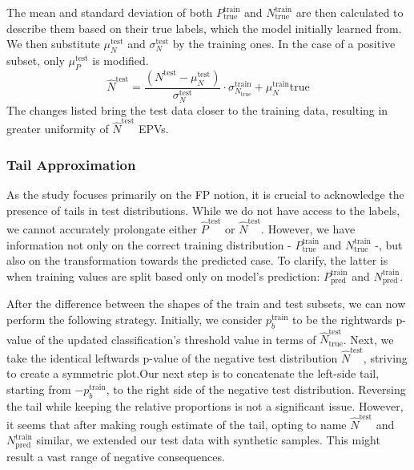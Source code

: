 \documentclass{article}
\begin{document}
The mean and standard deviation of both $P^{\text{train}}_{\text{true}}$ and $N^{\text{train}}_{\text{true}}$ are then calculated to describe them based on their true labels, which the model initially learned from. We then substitute $\mu^{\text{test}}_N$ and $\sigma^{\text{test}}_N$ by the training ones. In the case of a positive subset, only $\mu^{\text{test}}_P$ is modified.
    \begin{equation}
            \hat{N}^{\text{test}} = \frac{(N^{\text{test}} - \mu^{\text{test}}_N)}{\sigma^{\text{test}}_N} \cdot \sigma^{\text{train}}_{N_{\text{true}}} + \mu^{\text{train}}_N{\text{true}}
    \end{equation}
The changes listed bring the test data closer to the training data, resulting in greater uniformity  of $\hat{N}^{\text{test}}$ EPVs.



\subsubsection{Tail Approximation}

As the study focuses primarily on the FP notion, it is crucial to acknowledge the presence of tails in test distributions. While we do not have access to the labels, we cannot accurately prolongate either $\hat{P}^{\text{test}}$ or $ \hat{N}^{\text{test}}$. However, we have information not only on the correct training distribution - $P^{\text{train}}_{\text{true}}$ and $N^{\text{train}}_{\text{true}}$ -, but also on the transformation towards the predicted case. To clarify, the latter is when training values are split based only on model's prediction: $P^{\text{train}}_{\text{pred}}$ and $N^{\text{train}}_{\text{pred}}$. 

After  the difference between the shapes of the train and test subsets, we can now perform the following strategy. Initially, we consider $p^{\text{train}}_{b}$ to be the rightwards p-value of the updated classification's threshold value in terms of $\hat{N}^{\text{test}}_{\text{true}}$. Next, we take the identical leftwards p-value of the negative test distribution $ \hat{N}^{\text{test}}$, striving to create a symmetric plot.Our next step is to concatenate the left-side tail, starting from $-p^{\text{train}}_{b}$, to the right side of the negative test distribution. Reversing the tail while keeping the relative proportions is not a significant issue. However, it seems that after making rough estimate of the tail, opting to name $ \hat{N}^{\text{test}}$ and $N^{\text{train}}_{\text{pred}}$ similar, we extended our test data with synthetic samples. This might result a vast range of negative consequences. 
\end{document}
